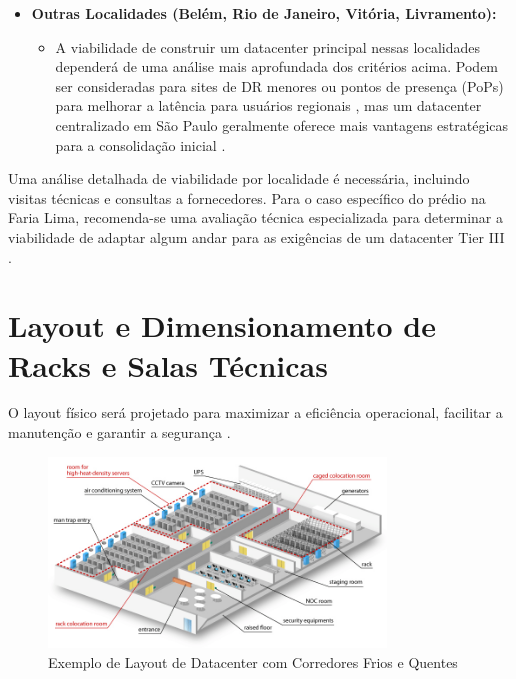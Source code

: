 \documentclass[
	12pt,				%
	oneside,			%
	a4paper,			%
	english,			%
	brazil				%
	]{abntex2unama}
\begin{document}
\begin{itemize}
	\item \textbf{Outras Localidades (Belém, Rio de Janeiro, Vitória, Livramento):}
	      \begin{itemize}
		      \item A viabilidade de construir um datacenter principal nessas localidades dependerá de uma análise mais aprofundada dos critérios acima. Podem ser consideradas para sites de DR menores ou pontos de presença (PoPs) para melhorar a latência para usuários regionais \cite{edge_computing}, mas um datacenter centralizado em São Paulo geralmente oferece mais vantagens estratégicas para a consolidação inicial \cite{hyperscale_datacenters}.
	      \end{itemize}
\end{itemize}
Uma análise detalhada de viabilidade por localidade é necessária, incluindo visitas técnicas e consultas a fornecedores. Para o caso específico do prédio na Faria Lima, recomenda-se uma avaliação técnica especializada para determinar a viabilidade de adaptar algum andar para as exigências de um datacenter Tier III \cite{reliability_engineering}.

\section{Layout e Dimensionamento de Racks e Salas Técnicas}
O layout físico será projetado para maximizar a eficiência operacional, facilitar a manutenção e garantir a segurança \cite{design_principles}.

\begin{figure}[h]
	\centering
	\includegraphics[width=0.8\textwidth]{datacenter.png}
	\caption{Exemplo de Layout de Datacenter com Corredores Frios e Quentes}
	\label{fig:layout_datacenter}
\end{figure}
\end{document}
